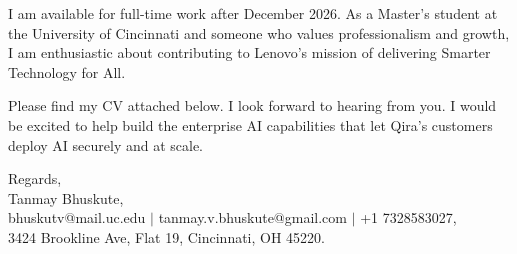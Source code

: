 \documentclass[11pt]{letter}
\begin{document}
\begin{letter}{}
I am available for full-time work after December 2026. As a Master's student at the University of Cincinnati and someone who values professionalism and growth, I am enthusiastic about contributing to Lenovo's mission of delivering Smarter Technology for All.

Please find my CV attached below. I look forward to hearing from you. I would be excited to help build the enterprise AI capabilities that let Qira's customers deploy AI securely and at scale.

{\setlength{\parskip}{0pt}
Regards,\\
Tanmay Bhuskute,\\
bhuskutv@mail.uc.edu $\mid$ tanmay.v.bhuskute@gmail.com $\mid$ +1 7328583027,\\
3424 Brookline Ave, Flat 19, Cincinnati, OH 45220.
}

\end{letter}
\end{document}
